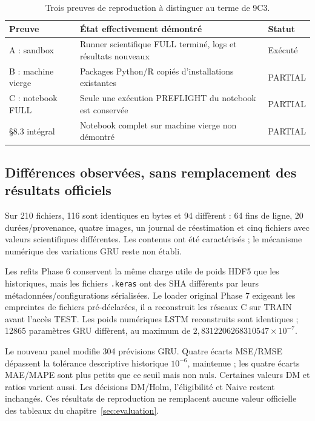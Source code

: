 \begin{table}[!htbp]
\centering
\caption{Trois preuves de reproduction à distinguer au terme de 9C3.}
\label{tab:reproduction_status}
\small
\begin{tabularx}{\linewidth}{lXl}
\toprule
Preuve & État effectivement démontré & Statut \\
\midrule
A : sandbox & Runner scientifique FULL terminé, logs et résultats nouveaux & Exécuté \\
B : machine vierge & Packages Python/R copiés d'installations existantes & PARTIAL \\
C : notebook FULL & Seule une exécution PREFLIGHT du notebook est conservée & PARTIAL \\
§8.3 intégral & Notebook complet sur machine vierge non démontré & PARTIAL \\
\bottomrule
\end{tabularx}
\end{table}

\subsection{Différences observées, sans remplacement des résultats officiels}
Sur 210 fichiers, 116 sont identiques en bytes et 94 diffèrent : 64 fins de ligne,
20 durées/provenance, quatre images, un journal de réestimation et cinq fichiers
avec valeurs scientifiques différentes. Les contenus ont été caractérisés ;
le mécanisme numérique des variations GRU reste non établi.

Les refits Phase 6 conservent la même charge utile de poids HDF5 que les
historiques, mais les fichiers \texttt{.keras} ont des SHA différents par
leurs métadonnées/configurations sérialisées. Le loader original Phase 7
exigeant les empreintes de fichiers pré-déclarées, il a reconstruit les réseaux
C sur TRAIN avant l'accès TEST. Les poids numériques LSTM reconstruits sont
identiques ; 12865 paramètres GRU diffèrent, au maximum de
\(2{,}8312206268310547\times10^{-7}\).

Le nouveau panel modifie 304 prévisions GRU. Quatre écarts MSE/RMSE dépassent
la tolérance descriptive historique \(10^{-6}\), maintenue ; les quatre écarts
MAE/MAPE sont plus petits que ce seuil mais non nuls. Certaines valeurs DM et
ratios varient aussi. Les décisions DM/Holm, l'éligibilité et Naive restent
inchangés. Ces résultats de reproduction ne remplacent aucune valeur
officielle des tableaux du chapitre~\ref{sec:evaluation}.

